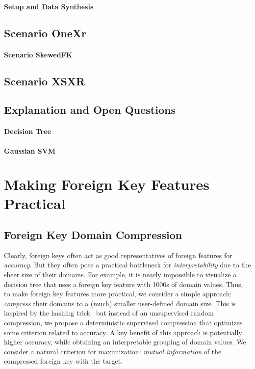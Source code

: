 \documentclass[sigconf]{acmart}
\begin{document}
\paragraph*{Setup and Data Synthesis}


\subsection{Scenario OneXr}

\paragraph*{Scenario SkewedFK}


\subsection{Scenario XSXR}


\subsection{Explanation and Open Questions}

\paragraph*{Decision Tree}

\paragraph*{Gaussian SVM}


\section{Making Foreign Key Features Practical}

\subsection{Foreign Key Domain Compression}

Clearly, foreign keys often act as good representatives of foreign features for \textit{accuracy}.
But they often pose a practical bottleneck for \textit{interpretability} due to the sheer size of their domains.
For example, it is nearly impossible to visualize a decision tree that uses a foreign key feature with 1000s of domain values.
Thus, to make foreign key features more practical, we consider a simple approach: \textit{compress} their domains to a (much) smaller 
user-defined domain size. This is inspired by the hashing trick~\cite{hashingtrick} but instead of an unsupervised random 
compression, we propose a deterministic supervised compression that optimizes some criterion related to accuracy. A key benefit of 
this approach is potentially higher accuracy, while obtaining an interpretable grouping of domain values.
We consider a natural criterion for maximization: \textit{mutual information} of the compressed foreign key with the target.
\end{document}
